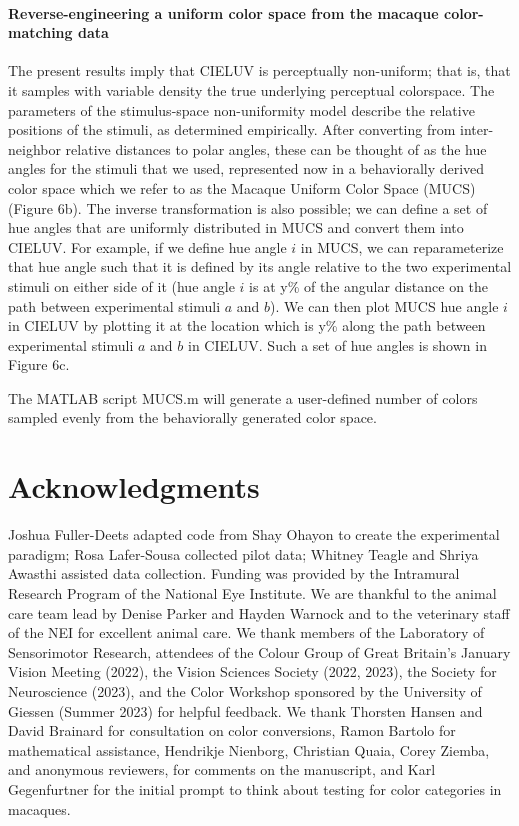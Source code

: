 \documentclass[9pt,biorxiv,lineno,onehalfspacing]{lapreprint}
\begin{document}
\begin{refsection}
\paragraph{Reverse-engineering a uniform color space from the macaque color-matching data}

The present results imply that CIELUV is perceptually non-uniform; that is, that it samples with variable density the true underlying perceptual colorspace. 
The parameters of the stimulus-space non-uniformity model describe the relative positions of the stimuli, as determined empirically. 
After converting from inter-neighbor relative distances to polar angles, these can be thought of as the hue angles for the stimuli that we used, represented now in a behaviorally derived color space which we refer to as the Macaque Uniform Color Space (MUCS) (Figure 6b). 
The inverse transformation is also possible; we can define a set of hue angles that are uniformly distributed in MUCS and convert them into CIELUV. 
For example, if we define hue angle $i$ in MUCS, we can reparameterize that hue angle such that it is defined by its angle relative to the two experimental stimuli on either side of it (hue angle $i$ is at y\% of the angular distance on the path between experimental stimuli $a$ and $b$). 
We can then plot MUCS hue angle $i$ in CIELUV by plotting it at the location which is y\% along the path between experimental stimuli $a$ and $b$ in CIELUV. 
Such a set of hue angles is shown in Figure 6c. 

The MATLAB script MUCS.m will generate a user-defined number of colors sampled evenly from the behaviorally generated color space.


\printbibliography[title=Methods References]
\end{refsection}

\section{Acknowledgments}

Joshua Fuller-Deets adapted code from Shay Ohayon to create the experimental paradigm; Rosa Lafer-Sousa collected pilot data; Whitney Teagle and Shriya Awasthi assisted data collection. 
Funding was provided by the Intramural Research Program of the National Eye Institute. 
We are thankful to the animal care team lead by Denise Parker and Hayden Warnock and to the veterinary staff of the NEI for excellent animal care. 
We thank members of the Laboratory of Sensorimotor Research, attendees of the Colour Group of Great Britain’s January Vision Meeting (2022), the Vision Sciences Society (2022, 2023), the Society for Neuroscience (2023), and the Color Workshop sponsored by the University of Giessen (Summer 2023) for helpful feedback. 
We thank Thorsten Hansen and David Brainard for consultation on color conversions, Ramon Bartolo for mathematical assistance, Hendrikje Nienborg, Christian Quaia, Corey Ziemba, and anonymous reviewers, for comments on the manuscript, and Karl Gegenfurtner for the initial prompt to think about testing for color categories in macaques.
\end{document}
